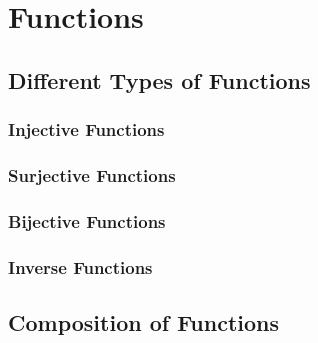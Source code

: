 \section{Functions}
\subsection{Different Types of Functions}
\subsubsection{Injective Functions}
\subsubsection{Surjective Functions}
\subsubsection{Bijective Functions}
\subsubsection{Inverse Functions}
\subsection{Composition of Functions}
